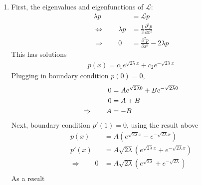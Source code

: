 \documentclass[12pt]{article}
\theoremstyle{plain}
\theoremstyle{definition}
\theoremstyle{remark}
\begin{document}
\begin{enumerate}
    \begin{enumerate}
      \item %
        First, the eigenvalues and eigenfunctions of $\mathscr{L}$:
        \begin{align*}
          \lambda p &= \mathscr{L} p\\
          \Leftrightarrow \qquad
          \lambda p &= \frac{1}{2} \frac{\partial^2 p}{\partial x^2}\\
          \Rightarrow \qquad
          0 &= \frac{\partial^2 p}{\partial x^2} -2\lambda p
        \end{align*}
        This has solutions
        \begin{align*}
          p(x) = c_1 e^{\sqrt{2\lambda} x} + c_2 e^{-\sqrt{2\lambda} x}
        \end{align*}
        Plugging in boundary condition $p(0)=0$,
        \begin{align}
          0 &= A e^{\sqrt{2\lambda} 0} + B e^{-\sqrt{2\lambda} 0} \notag\\
          0 &= A + B \notag \\
          \Rightarrow \qquad
          A &= -B \label{q3a.1}
        \end{align}
        Next, boundary condition $p'(1) = 0$, using the result above
        \begin{align*}
          p(x) &= A (e^{\sqrt{2\lambda} x} - e^{-\sqrt{2\lambda} x}) \\
          p'(x) &= A \sqrt{2\lambda} (e^{\sqrt{2\lambda} x} +  e^{-\sqrt{2\lambda} x}) \\
          \Rightarrow\qquad
          0 &=
          A \sqrt{2\lambda} (e^{\sqrt{2\lambda}} +  e^{-\sqrt{2\lambda}}) \\
        \end{align*}
        As a result
        \begin{align*}
        \end{align*}
    \end{enumerate}
\end{enumerate}
\end{document}
